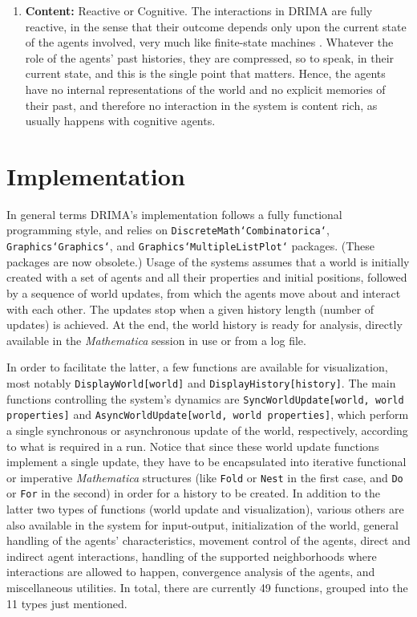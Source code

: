 \documentclass[11pt, a4paper]{article}
\begin{document}
\begin{enumerate}
\item \textbf{Content:} Reactive or Cognitive. The interactions in DRIMA are fully reactive, in the sense that their outcome depends only upon the current state of the agents involved, very much like finite-state machines \cite{ref7}. Whatever the role of the agents' past histories, they are compressed, so to speak, in their current state, and this is the single point that matters. Hence, the agents have no internal representations of the world and no explicit memories of their past, and therefore no interaction in the system is content rich, as usually happens with cognitive agents.
\end{enumerate}

\section{Implementation}

In general terms DRIMA's implementation follows a fully functional programming style, and relies on \texttt{DiscreteMath`Combinatorica`}, \texttt{Graphics`Graphics`}, and \texttt{Graphics`MultipleListPlot`} packages. (These packages are now obsolete.) Usage of the systems assumes that a world is initially created with a set of agents and all their properties and initial positions, followed by a sequence of world updates, from which the agents move about and interact with each other. The updates stop when a given history length (number of updates) is achieved. At the end, the world history is ready for analysis, directly available in the \textit{Mathematica} session in use or from a log file.

In order to facilitate the latter, a few functions are available for visualization, most notably \texttt{DisplayWorld[world]} and \texttt{DisplayHistory[history]}. The main functions controlling the system's dynamics are \texttt{SyncWorldUpdate[world, world properties]} and \texttt{AsyncWorldUpdate[world, world properties]}, which perform a single synchronous or asynchronous update of the world, respectively, according to what is required in a run. Notice that since these world update functions implement a single update, they have to be encapsulated into iterative functional or imperative \textit{Mathematica} structures (like \texttt{Fold} or \texttt{Nest} in the first case, and \texttt{Do} or \texttt{For} in the second) in order for a history to be created. In addition to the latter two types of functions (world update and visualization), various others are also available in the system for input-output, initialization of the world, general handling of the agents' characteristics, movement control of the agents, direct and indirect agent interactions, handling of the supported neighborhoods where interactions are allowed to happen, convergence analysis of the agents, and miscellaneous utilities. In total, there are currently 49 functions, grouped into the 11 types just mentioned.
\end{document}
